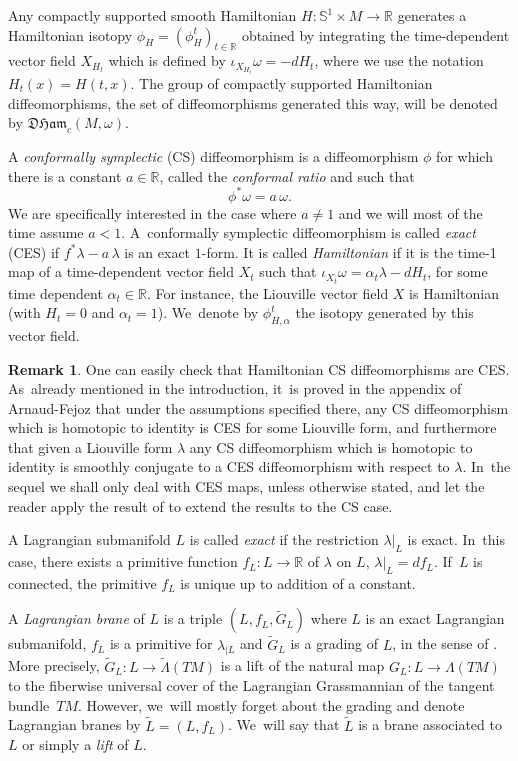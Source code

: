 \documentclass[JEP,XML,SOM,Unicode,NoFloatCountersInSection,published]{cedram}
\theoremstyle{definition}
\newtheorem{rem}[thm]{Remark}
\newcommand{\R}{\mathbb{R}}
\newcommand{\DHam}{\mathfrak{DHam}}
\begin{document}
Any compactly supported smooth Hamiltonian $H:\mathbb{S}^1\times M\to \R$ generates a Hamiltonian isotopy $\phi_H=(\phi_H^t)_{t\in\R}$ obtained by integrating the time-dependent vector field $X_{H_t}$ which is defined by $\iota_{X_{H_t}}\omega=-dH_t$, where we use the notation $H_t(x)=H(t,x)$. The group of compactly supported Hamiltonian diffeomorphisms, \ie the set of diffeomorphisms generated this way, will be denoted by $\DHam_c(M,\omega)$.

A \emph{conformally symplectic} (CS) diffeomorphism is a diffeomorphism $\phi$ for which there is a constant $a\in\R$, called the \emph{conformal ratio} and such that
\[
\phi^*\omega=a\,\omega.
\]
We are specifically interested in the case where $a\neq 1$ and we will most of the time assume $a<1$. A~conformally symplectic diffeomorphism is called \emph{exact} (CES) if $f^*\lambda-a\,\lambda$ is an exact $1$-form. It is called \emph{Hamiltonian} if it is the time-1 map of a time-dependent vector field $X_t$ such that $\iota_{X_t}\omega=\alpha_t\lambda-dH_t$, for some time dependent $\alpha_t\in\R$. For instance, the Liouville vector field $X$ is Hamiltonian (with $H_t=0$ and $\alpha_t=1$). We~denote by $\phi_{H, \alpha}^t$ the isotopy generated by this vector field.

\begin{rem}\label{rem:CSCES}
One can easily check that Hamiltonian CS diffeomorphisms are CES. As~already mentioned in the introduction, it~is proved in the appendix of Arnaud-Fejoz \cite{Arnaud-Fejoz} that under the assumptions specified there, any CS diffeomorphism which is homotopic to identity is CES for some Liouville form, and furthermore that given a Liouville form $\lambda$ any CS diffeomorphism which is homotopic to identity is smoothly conjugate to a CES diffeomorphism with respect to $\lambda$. In~the sequel we shall only deal with CES maps, unless otherwise stated, and let the reader apply the result of \cite{Arnaud-Fejoz} to extend the results to the CS case.
\end{rem}

A Lagrangian submanifold $L$ is called \emph{exact} if the restriction $\lambda|_L$ is exact. In~this case, there exists a primitive function $f_L:L\to\R$ of $\lambda$ on $L$, \ie $\lambda|_L=df_L$. If~$L$ is connected, the primitive $f_L$ is unique up to addition of a constant.

A \emph{Lagrangian brane} of $L$ is a triple $(L,f_L,\tilde{G}_L)$ where $L$ is an exact Lagrangian submanifold, $f_L$ is a primitive for $\lambda_{\mid L}$ and $\tilde{G}_L$ is a grading of $L$, in the sense of \cite{Seidel-graded}. More precisely, $\tilde{G}_L:L\to\tilde{\Lambda}(TM)$ is a lift of the natural map $G_L:L\to\Lambda(TM)$ to the fiberwise universal cover of the Lagrangian Grassmannian of the tangent bundle~$TM$. However, we~will mostly forget about the grading and denote Lagrangian branes by $\tilde L=(L,f_L)$. We~will say that $\tilde L$ is a brane associated to $L$ or simply a \emph{lift} of $L$.
\end{document}

